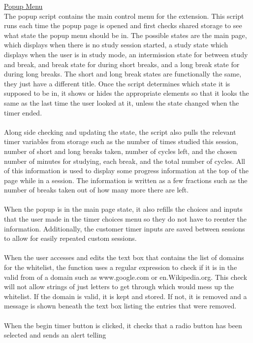 \documentclass[12pt]{article}
\begin{document}
\noindent \underline{Popup Menu} \\
The popup script contains the main control menu for the extension. This script runs each time the popup page
is opened and first checks shared storage to see what state the popup menu should be in. The possible states
are the main page, which displays when there is no study session started, a study state which displays when
the user is in study mode, an intermission state for between study and break, and break state for during short breaks,
and a long break state for during long breaks. The short and long break states are functionally the same, they just
have a different title. Once the script determines which state it is supposed to be in, it shows or hides the
appropriate elements so that it looks the same as the last time the user looked at it, unless the state changed when the timer ended.
\\\\Along side checking and updating the state, the script also pulls the relevant timer variables from storage such as
the number of times studied this session, number of short and long breaks taken, number of cycles left, and the chosen number of minutes
for studying, each break, and the total number of cycles. All of this information is used to display some progress information at the top of
the page while in a session. The information is written as a few fractions such as the number of breaks taken out of how many more there are left.
\\\\When the popup is in the main page state, it also refills the choices and inputs that the user made
in the timer choices menu so they do not have to reenter the information. Additionally, the customer timer inputs are saved between sessions to
allow for easily repeated custom sessions.
\\\\When the user accesses and edits the text box that contains the list of domains for the whitelist,
the function uses a regular expression to check if it is in the valid from of a domain such as www.google.com or en.Wikipedia.org.
This check will not allow strings of just letters to get through which would mess up the whitelist. If the domain is valid, it is kept and stored.
If not, it is removed and a message is shown beneath the text box listing the entries that were removed.
\\\\When the begin timer button is clicked, it checks that a radio button has been selected and sends an alert telling
\end{document}
